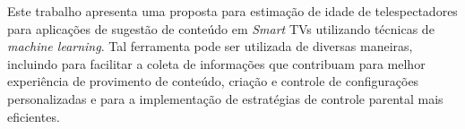 
  Este trabalho apresenta uma proposta para estimação de idade de telespectadores para aplicações de sugestão de conteúdo em \emph{Smart} TVs utilizando técnicas de \emph{machine learning}. Tal ferramenta pode ser utilizada de diversas maneiras, incluindo para facilitar a coleta de informações que contribuam para melhor experiência de provimento de conteúdo, criação e controle de configurações personalizadas e para a implementação de estratégias de controle parental mais eficientes.
